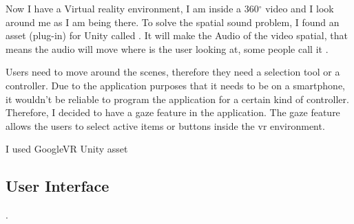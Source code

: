 Now I have a Virtual reality environment, I am inside a 360$^{\circ}$ video and I look around me as I am being there. To solve the spatial sound problem, I found an asset (plug-in) for Unity called . It will make the Audio of the video spatial, that means the audio will move where is the user looking at, some people call it .   

Users need to move around the scenes, therefore they need a selection tool or a controller. Due to the application purposes that it needs to be on a smartphone, it wouldn't be reliable to program the application for a certain kind of controller. Therefore, I decided to have a gaze feature in the application. The gaze feature allows the users to select active items or buttons inside the \acrshort{vr} environment. 





I used GoogleVR Unity asset






\subsection{User Interface}

 \citep{burdea2017virtual}.